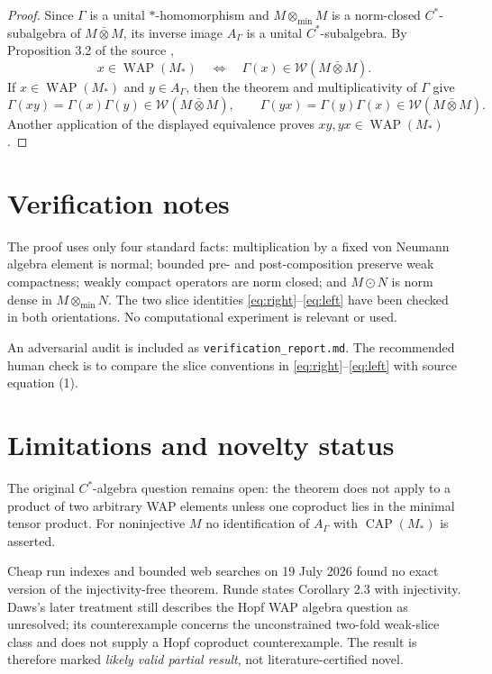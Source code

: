 \documentclass[11pt]{article}
\newcommand{\WAP}{\operatorname{WAP}}
\newcommand{\WC}{\mathcal W}
\begin{document}
\begin{proof}
Since $\Gamma$ is a unital $*$-homomorphism and
$M\otimes_{\min}M$ is a norm-closed $C^*$-subalgebra of
$M\bar\otimes M$, its inverse image $A_\Gamma$ is a unital
$C^*$-subalgebra.  By Proposition 3.2 of the source \cite{Runde},
\[
 x\in\WAP(M_*)\quad\Longleftrightarrow\quad
 \Gamma(x)\in\WC(M\bar\otimes M).
\]
If $x\in\WAP(M_*)$ and $y\in A_\Gamma$, then the theorem and multiplicativity
of $\Gamma$ give
\[
 \Gamma(xy)=\Gamma(x)\Gamma(y)\in\WC(M\bar\otimes M),
 \qquad
 \Gamma(yx)=\Gamma(y)\Gamma(x)\in\WC(M\bar\otimes M).
\]
Another application of the displayed equivalence proves
$xy,yx\in\WAP(M_*)$.
\end{proof}

\section{Verification notes}

The proof uses only four standard facts: multiplication by a fixed von Neumann
algebra element is normal; bounded pre- and post-composition preserve weak
compactness; weakly compact operators are norm closed; and
$M\odot N$ is norm dense in $M\otimes_{\min}N$.  The two slice identities
\eqref{eq:right}--\eqref{eq:left} have been checked in both orientations.
No computational experiment is relevant or used.

An adversarial audit is included as \texttt{verification\_report.md}.  The
recommended human check is to compare the slice conventions in
\eqref{eq:right}--\eqref{eq:left} with source equation (1).

\section{Limitations and novelty status}

The original $C^*$-algebra question remains open: the theorem does not apply
to a product of two arbitrary WAP elements unless one coproduct lies in the
minimal tensor product.  For noninjective $M$ no identification of $A_\Gamma$
with $\operatorname{CAP}(M_*)$ is asserted.

Cheap run indexes and bounded web searches on 19 July 2026 found no exact
version of the injectivity-free theorem.  Runde states Corollary 2.3 with
injectivity.  Daws's later treatment \cite{Daws} still describes the Hopf WAP
algebra question as unresolved; its counterexample concerns the unconstrained
two-fold weak-slice class and does not supply a Hopf coproduct counterexample.
The result is therefore marked \emph{likely valid partial result}, not
literature-certified novel.
\end{document}
